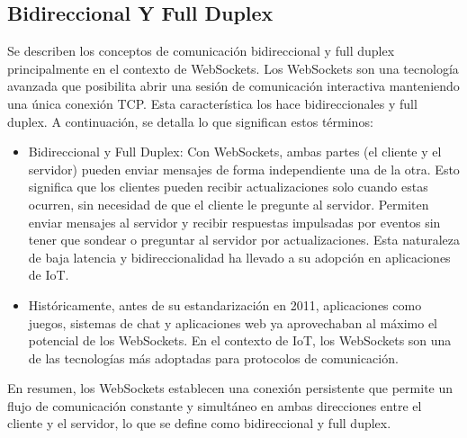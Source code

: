 \documentclass{report}
\begin{document}
\subsection{Bidireccional Y Full Duplex}
Se describen los conceptos de comunicación bidireccional y full duplex principalmente en el contexto de WebSockets.
Los WebSockets son una tecnología avanzada que posibilita abrir una sesión de comunicación interactiva manteniendo una única conexión TCP. 
Esta característica los hace bidireccionales y full duplex.
A continuación, se detalla lo que significan estos términos:
\begin{itemize}
    \item Bidireccional y Full Duplex: Con WebSockets, ambas partes (el cliente y el servidor) pueden enviar mensajes de forma independiente 
    una de la otra. Esto significa que los clientes pueden recibir actualizaciones solo cuando estas ocurren, sin necesidad de que el cliente 
    le pregunte al servidor. Permiten enviar mensajes al servidor y recibir respuestas impulsadas por eventos sin tener que sondear o preguntar 
    al servidor por actualizaciones. Esta naturaleza de baja latencia y bidireccionalidad ha llevado a su adopción en aplicaciones de IoT.
    \item Históricamente, antes de su estandarización en 2011, aplicaciones como juegos, sistemas de chat y aplicaciones web ya aprovechaban 
    al máximo el potencial de los WebSockets. En el contexto de IoT, los WebSockets son una de las tecnologías más adoptadas para protocolos 
    de comunicación.
\end{itemize}
En resumen, los WebSockets establecen una conexión persistente que permite un flujo de comunicación constante y simultáneo en ambas direcciones 
entre el cliente y el servidor, lo que se define como bidireccional y full duplex.
\end{document}
